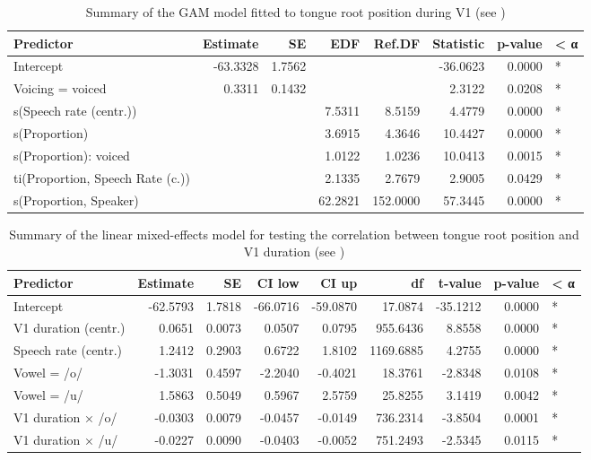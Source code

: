 \documentclass[preprint]{JASAnew}
\begin{document}
\begin{table}

\caption{\label{tab:tra-gam-ar-table}Summary of the GAM model fitted to tongue root position during V1 (see )}
\centering
\fontsize{10}{12}\selectfont
\begin{tabular}[t]{lrrrrrrl}
\toprule
Predictor & Estimate & SE & EDF & Ref.DF & Statistic & p-value & < α\\
\midrule
Intercept & -63.3328 & 1.7562 &  &  & -36.0623 & 0.0000 & *\\
Voicing = voiced & 0.3311 & 0.1432 &  &  & 2.3122 & 0.0208 & *\\
s(Speech rate (centr.)) &  &  & 7.5311 & 8.5159 & 4.4779 & 0.0000 & *\\
s(Proportion) &  &  & 3.6915 & 4.3646 & 10.4427 & 0.0000 & *\\
s(Proportion): voiced &  &  & 1.0122 & 1.0236 & 10.0413 & 0.0015 & *\\
ti(Proportion, Speech Rate (c.)) &  &  & 2.1335 & 2.7679 & 2.9005 & 0.0429 & *\\
s(Proportion, Speaker) &  &  & 62.2821 & 152.0000 & 57.3445 & 0.0000 & *\\
\bottomrule
\end{tabular}
\end{table}

\begin{table}

\caption{\label{tab:tra-lm-2-table}Summary of the linear mixed-effects model for testing the correlation between tongue root position and V1 duration  (see )}
\centering
\fontsize{10}{12}\selectfont
\begin{tabular}[t]{lrrrrrrrl}
\toprule
Predictor & Estimate & SE & CI low & CI up & df & t-value & p-value & < α\\
\midrule
Intercept & -62.5793 & 1.7818 & -66.0716 & -59.0870 & 17.0874 & -35.1212 & 0.0000 & *\\
V1 duration (centr.) & 0.0651 & 0.0073 & 0.0507 & 0.0795 & 955.6436 & 8.8558 & 0.0000 & *\\
Speech rate (centr.) & 1.2412 & 0.2903 & 0.6722 & 1.8102 & 1169.6885 & 4.2755 & 0.0000 & *\\
Vowel = /o/ & -1.3031 & 0.4597 & -2.2040 & -0.4021 & 18.3761 & -2.8348 & 0.0108 & *\\
Vowel = /u/ & 1.5863 & 0.5049 & 0.5967 & 2.5759 & 25.8255 & 3.1419 & 0.0042 & *\\
V1 duration × /o/ & -0.0303 & 0.0079 & -0.0457 & -0.0149 & 736.2314 & -3.8504 & 0.0001 & *\\
V1 duration × /u/ & -0.0227 & 0.0090 & -0.0403 & -0.0052 & 751.2493 & -2.5345 & 0.0115 & *\\
\bottomrule
\end{tabular}
\end{table}
\end{document}
